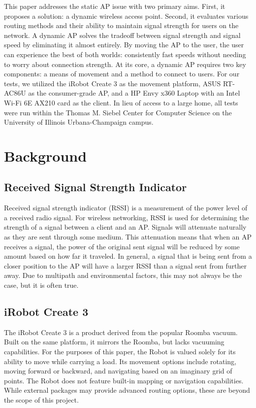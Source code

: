 This paper addresses the static AP issue with two primary aims. First, it proposes a solution: a dynamic wireless access point. Second, it evaluates various routing methods and their ability to maintain signal strength for users on the network. A dynamic AP solves the tradeoff between signal strength and signal speed by eliminating it almost entirely. By moving the AP to the user, the user can experience the best of both worlds: consistently fast speeds without needing to worry about connection strength. At its core, a dynamic AP requires two key components: a means of movement and a method to connect to users. For our tests, we utilized the iRobot Create 3 as the movement platform, ASUS RT-AC86U as the consumer-grade AP, and a HP Envy x360 Laptop with an Intel Wi-Fi 6E AX210 card as the client. In lieu of access to a large home, all tests were run within the Thomas M. Siebel Center for Computer Science on the University of Illinois Urbana-Champaign campus.

\section{Background}

\subsection{Received Signal Strength Indicator}

Received signal strength indicator (RSSI) is a measurement of the power level of a received radio signal. For wireless networking, RSSI is used for determining the strength of a signal between a client and an AP. Signals will attenuate naturally as they are sent through some medium. This attenuation means that when an AP receives a signal, the power of the original sent signal will be reduced by some amount based on how far it traveled. In general, a signal that is being sent from a closer position to the AP will have a larger RSSI than a signal sent from further away. Due to multipath and environmental factors, this may not always be the case, but it is often true.

\subsection{iRobot Create 3}

The iRobot Create 3 is a product derived from the popular Roomba vacuum. Built on the same platform, it mirrors the Roomba, but lacks vacuuming capabilities. For the purposes of this paper, the Robot is valued solely for its ability to move while carrying a load. Its movement options include rotating, moving forward or backward, and navigating based on an imaginary grid of points. The Robot does not feature built-in mapping or navigation capabilities. While external packages may provide advanced routing options, these are beyond the scope of this project.

